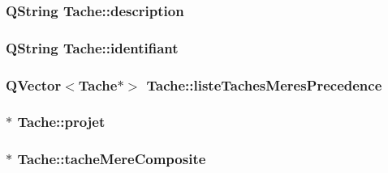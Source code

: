 \subsubsection[{description}]{\setlength{\rightskip}{0pt plus 5cm}Q\+String Tache\+::description\hspace{0.3cm}{\ttfamily [protected]}}\label{class_tache_ab3d06410b2c62ebfbe20f570c41dc4d4}
\hypertarget{class_tache_a9af1773c9b835900bba8814cccee450e}{}
\subsubsection[{identifiant}]{\setlength{\rightskip}{0pt plus 5cm}Q\+String Tache\+::identifiant\hspace{0.3cm}{\ttfamily [protected]}}\label{class_tache_a9af1773c9b835900bba8814cccee450e}
\hypertarget{class_tache_a0f73920789e27b7c2aeb47d171d5e543}{}
\subsubsection[{liste\+Taches\+Meres\+Precedence}]{\setlength{\rightskip}{0pt plus 5cm}Q\+Vector$<${\bf Tache}$\ast$$>$ Tache\+::liste\+Taches\+Meres\+Precedence\hspace{0.3cm}{\ttfamily [protected]}}\label{class_tache_a0f73920789e27b7c2aeb47d171d5e543}
\hypertarget{class_tache_a0c6d513a2a376b18cb73ab726fe4dec1}{}
\subsubsection[{projet}]{$\ast$ Tache\+::projet\hspace{0.3cm}{\ttfamily [protected]}}\label{class_tache_a0c6d513a2a376b18cb73ab726fe4dec1}
\hypertarget{class_tache_a62e6fe2722630c7bdf9a4a6a42364a19}{}
\subsubsection[{tache\+Mere\+Composite}]{$\ast$ Tache\+::tache\+Mere\+Composite\hspace{0.3cm}{\ttfamily [protected]}}\label{class_tache_a62e6fe2722630c7bdf9a4a6a42364a19}
\hypertarget{class_tache_a1d3d20046c0c4cc8482f71bb555b79cf}{}
